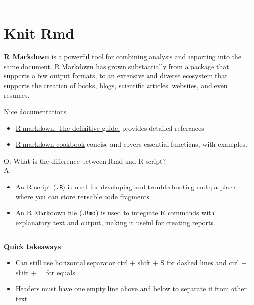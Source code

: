 \documentclass[
]{book}
\providecommand{\tightlist}{%
  \setlength{\itemsep}{0pt}\setlength{\parskip}{0pt}}
\begin{document}
\begin{center}\rule{0.5\linewidth}{0.5pt}\end{center}

\chapter{Knit Rmd}\label{knit-rmd}

\textbf{R Markdown} is a powerful tool for combining analysis and reporting into the same document. R Markdown has grown substantially from a package that supports a few output formats, to an extensive and diverse ecosystem that supports the creation of books, blogs, scientific articles, websites, and even resumes.

Nice documentations

\begin{itemize}
\tightlist
\item
  \href{https://bookdown.org/yihui/rmarkdown}{R markdown: The definitive guide.} provides detailed references
\item
  \href{https://bookdown.org/yihui/rmarkdown-cookbook/}{R markdown cookbook} concise and covers essential functions, with examples.
\end{itemize}

Q: What is the difference between Rmd and R script?\\
A:

\begin{itemize}
\tightlist
\item
  An R script (\texttt{.R}) is used for developing and troubleshooting code; a place where you can store reusable code fragments.
\item
  An R Markdown file (\texttt{.Rmd}) is used to integrate R commands with explanatory text and output, making it useful for creating reports.
\end{itemize}

\begin{center}\rule{0.5\linewidth}{0.5pt}\end{center}

\textbf{Quick takeaways}:

\begin{itemize}
\tightlist
\item
  Can still use horizontal separator ctrl + shift + S for dashed lines and ctrl + shift + = for equals
\item
  Headers must have one empty line above and below to separate it from other text
\end{itemize}
\end{document}
